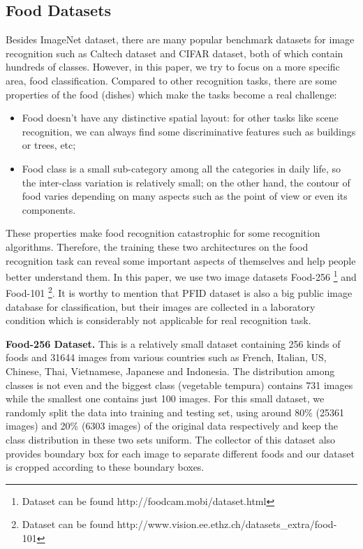 \subsection{Food Datasets}
Besides ImageNet dataset, there are many popular benchmark datasets for image recognition such as Caltech dataset and CIFAR dataset, both of which contain hundreds of classes. However, in this paper, we try to focus on a more specific area, food classification. Compared to other recognition tasks, there are some properties of the food (dishes) which make the tasks become a real challenge:
\begin{itemize}
	\item Food doesn't have any distinctive spatial layout: for other tasks like scene recognition, we can always find some discriminative features such as buildings or trees, etc;
	\item Food class is a small sub-category among all the categories in daily life, so the inter-class variation is relatively small; on the other hand, the contour of food varies depending on many aspects such as the point of view or even its components.
\end{itemize}
These properties make food recognition catastrophic for some recognition algorithms. Therefore, the training these two architectures on the food recognition task can reveal some important aspects of themselves and help people better understand them. In this paper, we use two image datasets Food-256 \cite{kawano14c}\footnote{Dataset can be found http://foodcam.mobi/dataset.html} and Food-101 \cite{bossard2014food}\footnote{Dataset can be found http://www.vision.ee.ethz.ch/datasets\_extra/food-101}. It is worthy to mention that PFID dataset is also a big public image database for classification, but their images are collected in a laboratory condition which is considerably not applicable for real recognition task.

\textbf{Food-256 Dataset.}
This is a relatively small dataset containing 256 kinds of foods and 31644 images from various countries such as French, Italian, US, Chinese, Thai, Vietnamese, Japanese and Indonesia. The distribution among classes is not even and the biggest class (vegetable tempura) contains 731 images while the smallest one contains just 100 images. For this small dataset, we randomly split the data into training and testing set, using around 80\% (25361 images) and 20\% (6303 images) of the original data respectively and keep the class distribution in these two sets uniform. The collector of this dataset also provides boundary box for each image to separate different foods and our dataset is cropped according to these boundary boxes.

